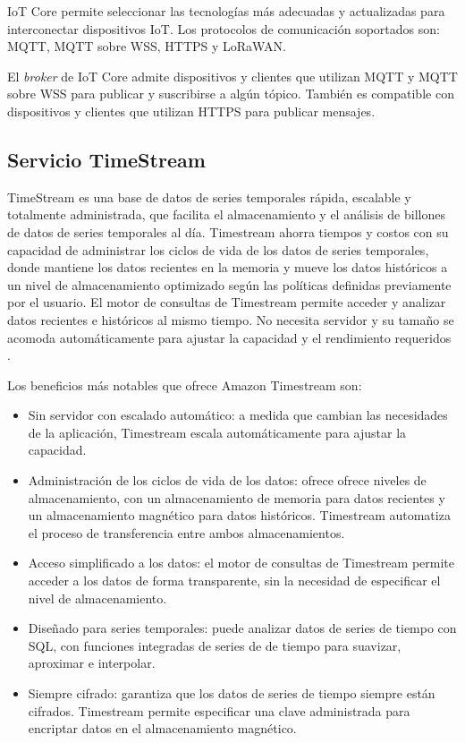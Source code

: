 IoT Core permite seleccionar las tecnologías más adecuadas y actualizadas para interconectar dispositivos IoT. Los protocolos de comunicación soportados son: MQTT, MQTT sobre WSS, HTTPS y LoRaWAN.

El \textit{broker} de IoT Core admite dispositivos y clientes que utilizan MQTT y MQTT sobre WSS para publicar y suscribirse a algún tópico. También es compatible con dispositivos y clientes que utilizan HTTPS para publicar mensajes.

\subsection{Servicio TimeStream}
TimeStream es una base de datos de series temporales rápida, escalable y totalmente administrada, que facilita el almacenamiento y el análisis de billones de datos de series temporales al día. Timestream ahorra tiempos y costos con su capacidad de administrar los ciclos de vida de los datos de series temporales, donde mantiene los datos recientes en la memoria y mueve los datos históricos a un nivel de almacenamiento optimizado según las políticas definidas previamente por el usuario. El motor de consultas de Timestream permite acceder y analizar datos recientes e históricos al mismo tiempo. No necesita servidor y su tamaño se acomoda automáticamente para ajustar la capacidad y el rendimiento requeridos \cite{timestream_info}.

Los beneficios más notables que ofrece Amazon Timestream son:
\begin{itemize}
	\item Sin servidor con escalado automático: a medida que cambian las necesidades de la aplicación, Timestream escala automáticamente para ajustar la capacidad.
	\item Administración de los ciclos de vida de los datos: ofrece ofrece niveles de almacenamiento, con un almacenamiento de memoria para datos recientes y un almacenamiento magnético para datos históricos. Timestream automatiza el proceso de transferencia entre ambos almacenamientos.
	\item Acceso simplificado a los datos: el motor de consultas de Timestream permite acceder a los datos de forma transparente, sin la necesidad de especificar el nivel de almacenamiento.
	\item Diseñado para series temporales: puede analizar datos de series de tiempo con SQL, con funciones integradas de series de de tiempo para suavizar, aproximar e interpolar.
	\item Siempre cifrado: garantiza que los datos de series de tiempo siempre están cifrados. Timestream permite especificar una clave administrada para encriptar datos en el almacenamiento magnético.
	
\end{itemize}

